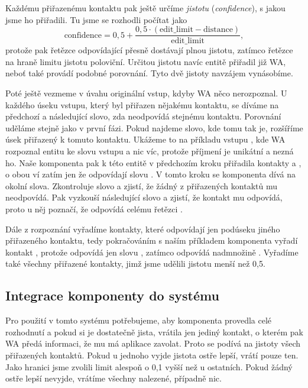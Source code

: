 Každému přiřazenému kontaktu pak ještě určíme \textit{jistotu} (\textit{confidence}),
s jakou jsme ho přiřadili. Tu jsme se rozhodli počítat jako
\[ \text{confidence} = 0,5 + \frac{0,5 \cdot (\text{edit\_limit} - \text{distance})}{\text{edit\_limit}} ,\]
protože pak řetězce odpovídající přesně dostávají plnou jistotu, zatímco řetězce na
hraně limitu jistotu poloviční. Určitou jistotu navíc entitě přiřadil již WA,
neboť také provádí podobné porovnání. Tyto dvě jistoty navzájem vynásobíme.

Poté ještě vezmeme v úvahu originální vstup, kdyby WA něco nerozpoznal. U každého
úseku vstupu, který byl přiřazen nějakému kontaktu, se díváme na předchozí a následující
slovo, zda neodpovídá stejnému kontaktu. Porovnání uděláme stejně jako v první fázi.
Pokud najdeme slovo, kde tomu tak je, rozšíříme úsek přiřazený k tomuto kontaktu. Ukážeme
to na příkladu vstupu , kde WA rozpoznal entitu 
ke slovu vstupu  a nic víc, protože příjmení je unikátní a nezná ho.
Naše komponenta pak k této entitě v předchozím kroku přiřadila
kontakty  a , o obou ví zatím jen že odpovídají slovu .
V tomto kroku se komponenta dívá na okolní slova.
Zkontroluje slovo  a zjistí, že žádný z přiřazených kontaktů mu neodpovídá. Pak
vyzkouší následující slovo  a zjistí, že kontakt  mu odpovídá,
proto u něj poznačí, že odpovídá celému řetězci .

Dále z rozpoznání vyřadíme kontakty, které odpovídají jen podúseku jiného
přiřazeného kontaktu, tedy pokračováním s naším příkladem komponenta vyřadí kontakt ,
protože odpovídá jen slovu , zatímco  odpovídá nadmnožině .
Vyřadíme také
všechny přiřazené kontakty, jimž jsme udělili jistotu menší než 0,5.

\subsection{Integrace komponenty do systému}

Pro použití v tomto systému potřebujeme, aby komponenta provedla
celé rozhodnutí a pokud si je dostatečně jista, vrátila jen jediný kontakt,
o kterém pak WA předá informaci, že mu má aplikace zavolat. Proto
se podívá na jistoty všech přiřazených kontaktů. Pokud u jednoho
vyjde jistota ostře lepší, vrátí pouze ten. Jako hranici
 jsme zvolili limit alespoň o 0,1 vyšší než u
ostatních. Pokud žádný ostře lepší nevyjde, vrátíme všechny
nalezené, případně nic.